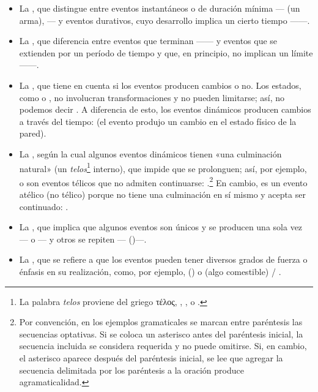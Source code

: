 \begin{itemize}
  \item La , que distingue entre eventos instantáneos o de
        duración mínima --- (un arma),
        --- y eventos durativos, cuyo desarrollo implica un
        cierto tiempo ------.
  \item La , que diferencia entre eventos que terminan
        ------ y eventos que se
        extienden por un período de tiempo y que, en principio, no implican un
        límite ------.
  \item La , que tiene en cuenta si los eventos producen
        cambios o no. Los estados, como  o ,
        no involucran transformaciones y no pueden limitarse; así, no podemos
        decir . A diferencia de esto, los eventos dinámicos producen
        cambios a través del tiempo:  (el evento
        produjo un cambio en el estado físico de la pared).
  \item La , según la cual algunos eventos dinámicos tienen
        «una culminación natural» (un \textit{telos}\footnote{La palabra
        \textit{telos} proviene del griego τέλος, , ,
         o .} interno), que impide que se prolonguen;
        así, por ejemplo,  o 
        son eventos télicos que no admiten continuarse: .\footnote{Por convención,
        en los ejemplos gramaticales se marcan entre paréntesis las secuencias
        optativas. Si se coloca un asterisco antes del paréntesis inicial, la
        secuencia incluida se considera requerida y no puede omitirse. Si, en
        cambio, el asterisco aparece después del paréntesis inicial, se lee que
        agregar la secuencia delimitada por los paréntesis a la oración produce
        agramaticalidad.} En cambio,  es un evento atélico (no
        télico) porque no tiene una culminación en sí mismo y acepta ser
        continuado: .
  \item La , que implica que algunos eventos son únicos y se
        producen una sola vez --- o --- y otros se repiten --- ()---.
  \item La , que se refiere a que los eventos pueden tener
        diversos grados de fuerza o énfasis en su realización, como, por
        ejemplo,  () o  (algo comestible) / .
\end{itemize}

